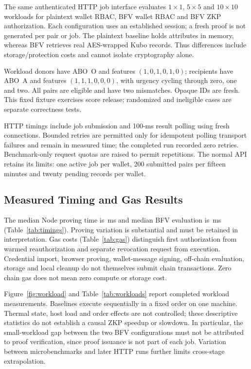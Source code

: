 \documentclass[10pt,twocolumn,a4paper]{article}
\begin{document}
The same authenticated HTTP job interface evaluates $1\times1$, $5\times5$ and
$10\times10$ workloads for plaintext wallet RBAC, BFV wallet RBAC and BFV ZKP
authorization. Each configuration uses an established session; a fresh proof is not
generated per pair or job. The plaintext baseline holds attributes in memory,
whereas BFV retrieves real AES-wrapped Kubo records. Thus differences include
storage/protection costs and cannot isolate cryptography alone.

Workload donors have ABO~O and features $(1,0,1,0,1,0)$; recipients have ABO~A and
features $(1,1,1,0,0,0)$, with urgency cycling through zero, one and two. All pairs
are eligible and have two mismatches. Opaque IDs are fresh. This fixed fixture
exercises score release; randomized and ineligible cases are separate correctness
tests.

HTTP timings include job submission and 100-ms result polling using fresh
connections. Bounded retries are permitted only for idempotent polling transport
failures and remain in measured time; the completed run recorded zero retries.
Benchmark-only request quotas are raised to permit repetitions. The normal API
retains its limits: one active job per wallet, 200 submitted pairs per fifteen
minutes and twenty pending records per wallet.

\subsection{Measured Timing and Gas Results}




The median Node proving time is \ProofMedianMs{}\,ms and median BFV evaluation is
\EvaluationMedianMs{}\,ms (Table~\ref{tab:timings}). Proving variation is substantial
and must be retained in interpretation. Gas costs (Table~\ref{tab:gas}) distinguish
first authorization from warmed reauthorization and separate revocation request
from execution. Credential import, browser proving, wallet-message signing,
off-chain evaluation, storage and local cleanup do not themselves submit chain
transactions. Zero chain gas does not mean zero compute or storage cost.

Figure~\ref{fig:workload} and Table~\ref{tab:workloads} report completed workload
measurements. Baselines execute sequentially in a fixed order on one machine.
Thermal state, host load and order effects are not controlled; these descriptive
statistics do not establish a causal ZKP speedup or slowdown. In particular, the
small-workload gap between the two BFV configurations must not be attributed to
proof verification, since proof issuance is not part of each job. Variation between
microbenchmarks and later HTTP runs further limits cross-stage extrapolation.
\end{document}
